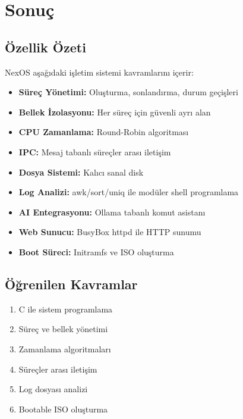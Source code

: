 \documentclass[12pt,a4paper]{report}
\begin{document}
\chapter{Sonuç}

\section{Özellik Özeti}

NexOS aşağıdaki işletim sistemi kavramlarını içerir:

\begin{itemize}
    \item \textbf{Süreç Yönetimi:} Oluşturma, sonlandırma, durum geçişleri
    \item \textbf{Bellek İzolasyonu:} Her süreç için güvenli ayrı alan
    \item \textbf{CPU Zamanlama:} Round-Robin algoritması
    \item \textbf{IPC:} Mesaj tabanlı süreçler arası iletişim
    \item \textbf{Dosya Sistemi:} Kalıcı sanal disk
    \item \textbf{Log Analizi:} awk/sort/uniq ile modüler shell programlama
    \item \textbf{AI Entegrasyonu:} Ollama tabanlı komut asistanı
    \item \textbf{Web Sunucu:} BusyBox httpd ile HTTP sunumu
    \item \textbf{Boot Süreci:} Initramfs ve ISO oluşturma
\end{itemize}

\section{Öğrenilen Kavramlar}

\begin{enumerate}
    \item C ile sistem programlama
    \item Süreç ve bellek yönetimi
    \item Zamanlama algoritmaları
    \item Süreçler arası iletişim
    \item Log dosyası analizi
    \item Bootable ISO oluşturma
\end{enumerate}
\end{document}
